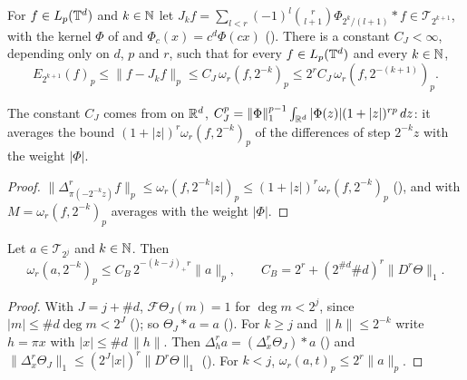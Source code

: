 \begin{theorem}
\label{thm:torus-lp-jackson}
\leanok
{}
For $f \in L_p(\mathbb{T}^d)$ and $k \in \mathbb{N}$ let
$J_k f = \sum_{l < r} (-1)^l \binom{r}{l+1} \Phi_{2^k/(l+1)} * f \in \mathcal{T}_{2^{k+1}}$, with
the kernel $\Phi$ of  and $\Phi_c(x) = c^d \Phi(c x)$
(). There is a constant $C_J < \infty$, depending only on $d$,
$p$ and $r$, such that for every $f \in L_p(\mathbb{T}^d)$ and every $k \in \mathbb{N}$,
\[
  E_{2^{k+1}}(f)_p \leq \|f - J_k f\|_p \leq C_J \, \omega_r(f, 2^{-k})_p
  \leq 2^r C_J \, \omega_r(f, 2^{-(k+1)})_p .
\]
\end{theorem}

The constant $C_J$ comes from  on $\mathbb{R}^d$,
$C_J^p = \|\Phi\|_1^{p-1} \int_{\mathbb{R}^d} |\Phi(z)| (1 + |z|)^{rp} \, dz$: it averages the bound
$(1 + |z|)^r \omega_r(f, 2^{-k})_p$ of the differences of step $2^{-k} z$ with the weight $|\Phi|$.

\begin{proof}
\leanok
$\|\Delta^r_{\pi(-2^{-k} z)} f\|_p \leq \omega_r(f, 2^{-k} |z|)_p \leq
(1 + |z|)^r \omega_r(f, 2^{-k})_p$ (), and
 with $M = \omega_r(f, 2^{-k})_p$ averages with the weight
$|\Phi|$.
\end{proof}

\begin{theorem}
\label{thm:torus-lp-bernstein}
\leanok
{}
Let $a \in \mathcal{T}_{2^j}$ and $k \in \mathbb{N}$. Then
\[
  \omega_r(a, 2^{-k})_p \leq C_B \, 2^{-(k-j)_+ r} \|a\|_p ,
  \qquad C_B = 2^r + (2^{\#d} \#d)^r \|D^r \Theta\|_1 .
\]
\end{theorem}

\begin{proof}
\leanok
With $J = j + \#d$, $\mathcal{F}\Theta_J(m) = 1$ for $\deg m < 2^j$, since
$|m| \leq \#d \deg m < 2^J$ (); so $\Theta_J * a = a$
(). For $k \geq j$ and $\|h\| \leq 2^{-k}$ write $h = \pi x$ with
$|x| \leq \#d \, \|h\|$. Then $\Delta^r_h a = (\Delta^r_x \Theta_J) * a$
() and
$\|\Delta^r_x \Theta_J\|_1 \leq (2^J |x|)^r \|D^r \Theta\|_1$ (). For
$k < j$, $\omega_r(a, t)_p \leq 2^r \|a\|_p$.
\end{proof}

